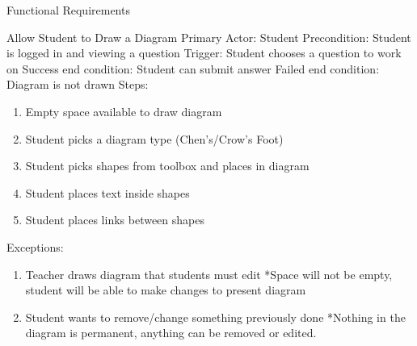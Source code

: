 \documentclass{article}
\begin{document}
\newpage
\begin{section}{Functional Requirements}

    \begin{subsection}{Allow Student to Draw a Diagram}
    Primary Actor: Student \newline
    Precondition: Student is logged in and viewing a            question \newline
    Trigger: Student chooses a question to work on \newline
    Success end condition: Student can submit answer            \newline
    Failed end condition: Diagram is not drawn \newline
    \newline
    Steps:
    \begin{enumerate}
    \item{Empty space available to draw diagram}
    \item{Student picks a diagram type (Chen’s/Crow’s Foot)}
    \item{Student picks shapes from toolbox and places in           diagram}
    \item{Student places text inside shapes}
    \item{Student places links between shapes}
    \end{enumerate}
    Exceptions:
    \begin{enumerate}
    \item{Teacher draws diagram that students must edit             \newline
        *Space will not be empty, student will be able to           make changes to present diagram}
    \addtocounter{enumi}{1}
    \item{Student wants to remove/change something                  previously done \newline
        *Nothing in the diagram is permanent, anything can          be removed or edited.} 
    \end{enumerate}
    \end{subsection}
    

\end{section}
\end{document}
